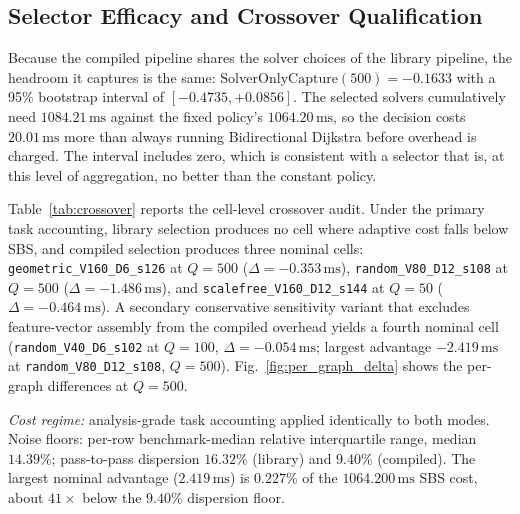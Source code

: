 \documentclass[conference]{IEEEtran}
\begin{document}
\subsection{Selector Efficacy and Crossover Qualification}
Because the compiled pipeline shares the solver choices of the library pipeline, the headroom it captures is the same: $\mathrm{SolverOnlyCapture}(500) = -0.1633$ with a 95\% bootstrap interval of $[-0.4735, +0.0856]$. The selected solvers cumulatively need $1084.21\,\mathrm{ms}$ against the fixed policy's $1064.20\,\mathrm{ms}$, so the decision costs $20.01\,\mathrm{ms}$ more than always running Bidirectional Dijkstra before overhead is charged. The interval includes zero, which is consistent with a selector that is, at this level of aggregation, no better than the constant policy.

Table~\ref{tab:crossover} reports the cell-level crossover audit. Under the primary task accounting, library selection produces no cell where adaptive cost falls below SBS, and compiled selection produces three nominal cells: \texttt{geometric\_V160\_D6\_s126} at $Q=500$ ($\Delta = -0.353\,\mathrm{ms}$), \texttt{random\_V80\_D12\_s108} at $Q=500$ ($\Delta = -1.486\,\mathrm{ms}$), and \texttt{scalefree\_V160\_D12\_s144} at $Q=50$ ($\Delta = -0.464\,\mathrm{ms}$). A secondary conservative sensitivity variant that excludes feature-vector assembly from the compiled overhead yields a fourth nominal cell (\texttt{random\_V40\_D6\_s102} at $Q=100$, $\Delta = -0.054\,\mathrm{ms}$; largest advantage $-2.419\,\mathrm{ms}$ at \texttt{random\_V80\_D12\_s108}, $Q=500$). Fig.~\ref{fig:per_graph_delta} shows the per-graph differences at $Q=500$.

\begin{table}[t]
\caption{Crossover Audit and Noise Qualification Across the 40 Graph--Workload Cells}
\label{tab:crossover}
\centering
{}
\vspace{0.4ex}
\raggedright
\scriptsize \textit{Cost regime:} analysis-grade task accounting applied identically to both modes. Noise floors: per-row benchmark-median relative interquartile range, median $14.39\%$; pass-to-pass dispersion $16.32\%$ (library) and $9.40\%$ (compiled). The largest nominal advantage ($2.419\,\mathrm{ms}$) is $0.227\%$ of the $1064.200\,\mathrm{ms}$ SBS cost, about $41\times$ below the $9.40\%$ dispersion floor.
\end{table}
\end{document}
